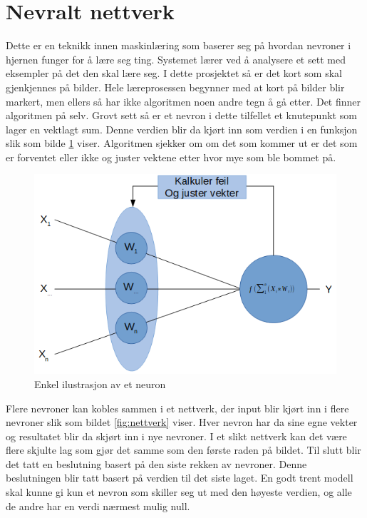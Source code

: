 \section{Nevralt nettverk}
Dette er en teknikk innen maskinlæring som baserer seg på hvordan nevroner i hjernen funger for å lære seg ting. Systemet lærer ved å analysere et sett med eksempler på det den skal lære seg. I dette prosjektet så er det kort som skal gjenkjennes på bilder. Hele læreprosessen begynner med at kort på bilder blir markert, men ellers så har ikke algoritmen noen andre tegn å gå etter. Det finner algoritmen på selv.\newline
Grovt sett så er et nevron i dette tilfellet et knutepunkt som lager en vektlagt sum. Denne verdien blir da kjørt inn som verdien i en funksjon slik som bilde \ref{fig:neuron} viser. Algoritmen sjekker om om det som kommer ut er det som er forventet eller ikke og juster vektene etter hvor mye som ble bommet på.\newline
\begin{figure}[ht]
    \centering
    \includegraphics[width=\textwidth]{images/neuron.png}
    \caption{Enkel ilustrasjon av et neuron}
    \label{fig:neuron}
\end{figure}
Flere nevroner kan kobles sammen i et nettverk, der input blir kjørt inn i flere nevroner slik som bildet \ref{fig:nettverk} viser. Hver nevron har da sine egne vekter og resultatet blir da skjørt inn i nye nevroner. I et slikt nettverk kan det være flere skjulte lag som gjør det samme som den første raden på bildet. Til slutt blir det tatt en beslutning basert på den siste rekken av nevroner. Denne beslutningen blir tatt basert på verdien til det siste laget. En godt trent modell skal kunne gi kun et nevron som skiller seg ut med den høyeste verdien, og alle de andre har en verdi nærmest mulig null.\newline

